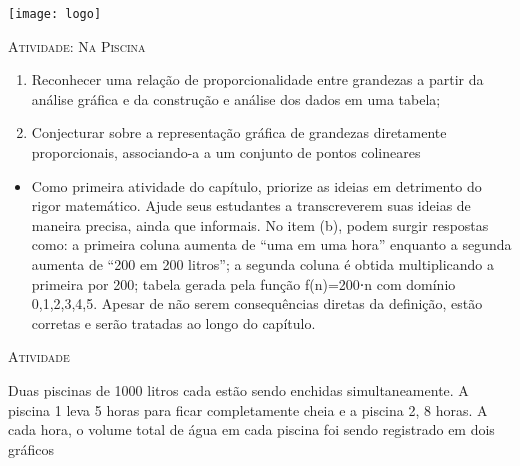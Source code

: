 \documentclass[10 pt,usenames,dvipsnames, oneside]{article}
\begin{document}
\begin{center}
  \begin{minipage}[l]{3cm}
\texttt{[image: logo]}    
\end{minipage}\hfill
\begin{minipage}[r]{.8\textwidth}
 {\Large \scshape Atividade: Na Piscina}  
\end{minipage}
\end{center}
\vspace{.2cm}

\ifdefined\prof
\begin{objetivos}
\item \phantom{a}
\end{objetivos}

\begin{goals}
\begin{enumerate}
\item Reconhecer uma relação de proporcionalidade entre grandezas a partir da análise gráfica e da construção e análise dos dados em uma tabela;

\item Conjecturar sobre a representação gráfica de grandezas diretamente proporcionais, associando-a a um conjunto de pontos colineares
\end{enumerate}

\tcblower

\begin{itemize}
\item Como primeira atividade do capítulo, priorize as ideias em detrimento do rigor matemático. Ajude seus estudantes a transcreverem suas ideias de maneira precisa, ainda que informais.
No item (b), podem surgir respostas como: a primeira coluna aumenta de “uma em uma hora” enquanto a segunda aumenta de “200 em 200 litros”; a segunda coluna é obtida multiplicando a primeira por 200; tabela gerada pela função f(n)=200⋅n com domínio {0,1,2,3,4,5}. Apesar de não serem consequências diretas da definição, estão corretas e serão tratadas ao longo do capítulo.
\end{itemize}
\end{goals}

\bigskip
\begin{center}
{\large \scshape Atividade}
\end{center}
\fi

Duas piscinas de 1000 litros cada estão sendo enchidas simultaneamente. A piscina 1 leva 5 horas para ficar completamente cheia e a piscina 2, 8 horas. A cada hora, o volume total de água em cada piscina foi sendo registrado em dois gráficos
\end{document}
